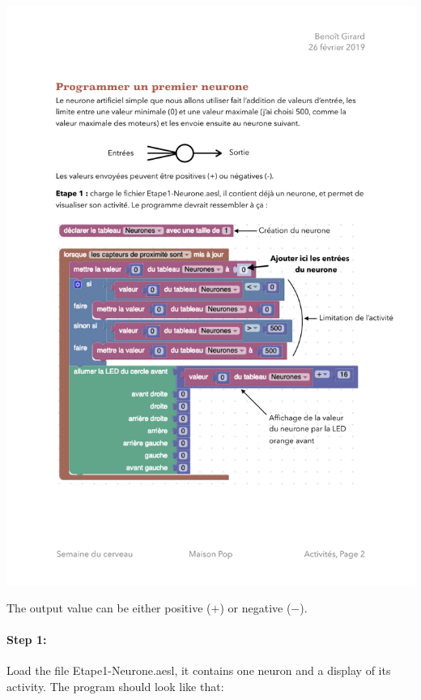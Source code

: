 \documentclass[12pt]{article}
\newcommand{\firstfile}{Etape1-Neurone.aesl}
\begin{document}
\includegraphics{../SchemaNeuroneArtificiel.pdf}

The output value can be either positive ($+$) or negative ($-$).

\paragraph{Step 1:} Load the file \firstfile, it contains one neuron and a display of its activity. The program should look like that:
\end{document}
